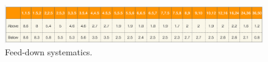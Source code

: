 \begin{figure}[!b]
\begin{center}
 \includegraphics[width=1.0\textwidth]{figures/Dstar/pp13TeV/prompt-fraction.png}
\caption{Feed-down systematics.}
\label{fig:Dstarfeeddown_cent2}
\end{center}
\end{figure}



